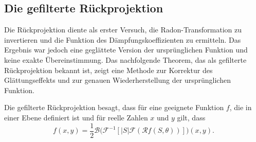 \subsection{Die gefilterte Rückprojektion
	\label{ct:subsection:gefilterterueck}}
Die Rückprojektion diente als erster Versuch, die Radon-Transformation zu invertieren und die Funktion des Dämpfungskoeffizienten zu ermitteln. Das Ergebnis war jedoch eine geglättete Version der ursprünglichen Funktion und keine exakte Übereinstimmung. Das nachfolgende Theorem, das als gefilterte Rückprojektion bekannt ist, zeigt eine Methode zur Korrektur des Glättungseffekts und zur genauen Wiederherstellung der ursprünglichen Funktion.

Die gefilterte Rückprojektion besagt, dass für eine geeignete Funktion $f$, die in einer Ebene definiert ist und für reelle Zahlen $x$ und $y$ gilt, dass
\begin{equation}
	f(x, y) = \dfrac{1}{2}\mathscr{B}\biggl(\mathscr{F}^{-1}[|S|\mathscr{F}(\mathscr{R}f(S, \theta))]\biggr)(x,y).
\end{equation}

